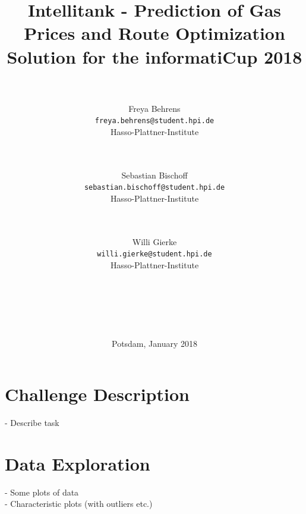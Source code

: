 \documentclass[%
a4paper,
DIV12,
2.5headlines,
bigheadings,
titlepage,
openbib,
]{scrartcl}
\begin{document}
\providecommand{\tightlist}{%
  \setlength{\itemsep}{0pt}\setlength{\parskip}{0pt}}

\DeclareRobustCommand{\desiredTitle}{
  Intellitank - Prediction of Gas Prices and Route Optimization \\\normalsize{Solution for the informatiCup 2018}
}

\DeclareRobustCommand{\desiredAuthor}{
  \\\\Freya Behrens\\\texttt{freya.behrens@student.hpi.de}\\Hasso-Plattner-Institute \and \\\\Sebastian Bischoff\\\texttt{sebastian.bischoff@student.hpi.de}\\Hasso-Plattner-Institute \and \\\\Willi Gierke\\\texttt{willi.gierke@student.hpi.de}\\Hasso-Plattner-Institute\\\\\\\\\\\\
}

\begin{titlepage}
\begin{center}
   \title{\desiredTitle}
   \author{\desiredAuthor}
   \date{Potsdam, January 2018}
   \maketitle
\end{center}
\end{titlepage}

\pagebreak

\tableofcontents
\pagebreak

\section{Challenge Description}\label{challenge-description}
- Describe task

\section{Data Exploration}\label{data-exploration}
- Some plots of data\\
- Characteristic plots (with outliers etc.)
\end{document}
